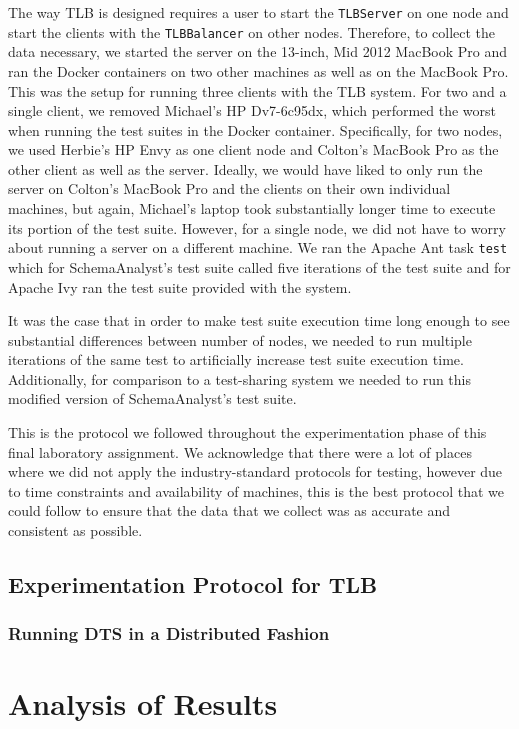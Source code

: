\documentclass{article}
\begin{document}
{The way TLB is designed requires a user to start the \texttt{TLBServer} on one node and start the clients with the \texttt{TLBBalancer}
on other nodes. Therefore, to collect the data necessary, we started the server on the 13-inch, Mid 2012 MacBook Pro
and ran the Docker containers on two other machines as well as on the MacBook Pro. This was the setup for running three
clients with the TLB system. For two and a single client, we removed Michael's HP Dv7-6c95dx,  which performed the
worst when running the test suites in the Docker container. Specifically, for two nodes, we used Herbie's HP Envy
as one client node and Colton's MacBook Pro as the other client as well as the server.
Ideally, we would have liked to only run the server on Colton's MacBook Pro and the clients on their own
individual machines, but again, Michael's laptop took substantially longer time to execute its portion of the test suite.
However, for a single node, we did not have to worry about running a server on a different machine. We ran the Apache Ant
task \texttt{test} which for SchemaAnalyst's test suite called five iterations of the test suite and for Apache Ivy
ran the test suite provided with the system.

It was the case that in order to make test suite execution time long enough to see substantial differences between
number of nodes, we needed to run multiple iterations of the same test to artificially increase test suite execution
time. Additionally, for comparison to a test-sharing system we needed to run this modified version of SchemaAnalyst's
test suite.

This is the protocol we followed throughout the experimentation phase of this final laboratory assignment. We acknowledge that
there were a lot of places where we did not apply the industry-standard protocols for testing, however due to time constraints
and availability of machines, this is the best protocol that we could follow to ensure that the data that we collect
was as accurate and consistent as possible.

\subsection{Experimentation Protocol for TLB}
\subsubsection{Running DTS in a Distributed Fashion}

\section{Analysis of Results}
\label{analysis}

}
\end{document}
